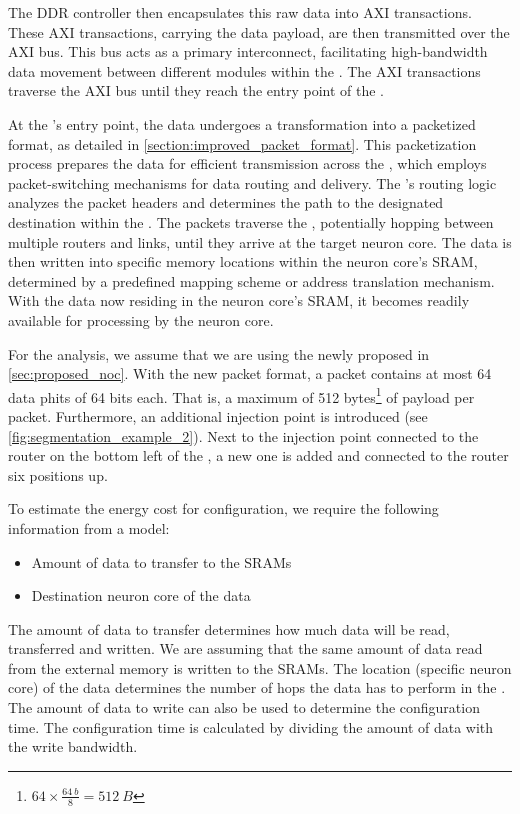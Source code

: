 The DDR controller then encapsulates this raw data into AXI transactions.
These AXI transactions, carrying the data payload, are then transmitted over the AXI bus.
This bus acts as a primary interconnect, facilitating high-bandwidth data movement between different modules within the \graicore{}.
The AXI transactions traverse the AXI bus until they reach the entry point of the \confignoc{}.

At the \confignoc{}'s entry point, the data undergoes a transformation into a packetized format, as detailed in \cref{section:improved_packet_format}.
This packetization process prepares the data for efficient transmission across the \confignoc{}, which employs packet-switching mechanisms for data routing and delivery.
The \confignoc{}'s routing logic analyzes the packet headers and determines the path to the designated destination within the \graicore{}.
The packets traverse the \confignoc{}, potentially hopping between multiple routers and links, until they arrive at the target neuron core.
The data is then written into specific memory locations within the neuron core's SRAM, determined by a predefined mapping scheme or address translation mechanism.
With the data now residing in the neuron core's SRAM, it becomes readily available for processing by the neuron core.

For the analysis, we assume that we are using the newly proposed \confignoc{} in \cref{sec:proposed_noc}. 
With the new packet format, a packet contains at most 64 data phits of 64 bits each.
That is, a maximum of 512 bytes\footnote{$64 \times \frac{\SI{64}{b}}{8} = \SI{512}{B}$} of payload per packet.
Furthermore, an additional injection point is introduced (see \cref{fig:segmentation_example_2}).
Next to the injection point connected to the router on the bottom left of the \confignoc{}, a new one is added and connected to the router six positions up.

To estimate the energy cost for configuration, we require the following information from a model:
\begin{itemize}
    \item Amount of data to transfer to the SRAMs
    \item Destination neuron core of the data
\end{itemize}

The amount of data to transfer determines how much data will be read, transferred and written.
We are assuming that the same amount of data read from the external memory is written to the SRAMs.
The location (specific neuron core) of the data determines the number of hops the data has to perform in the \confignoc{}.
The amount of data to write can also be used to determine the configuration time.
The configuration time is calculated by dividing the amount of data with the write bandwidth.

